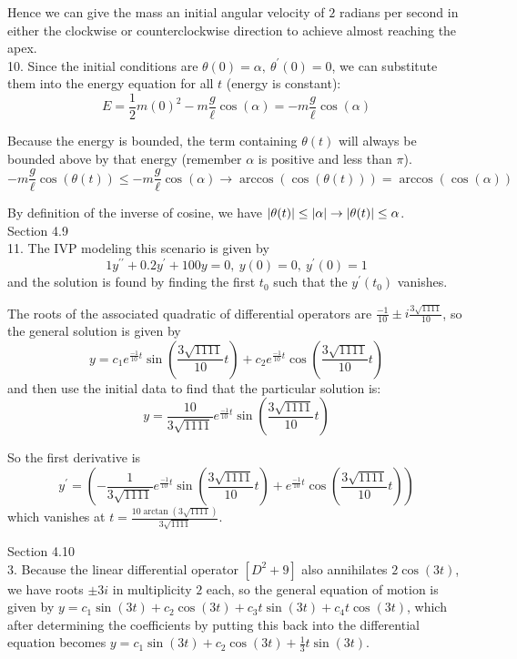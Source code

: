\documentclass[11pt]{article}
\newcommand{\br}[1]{\left(#1\right)}
\newcommand{\sbr}[1]{\left[#1\right]}
\newcommand{\dprime}{\prime\prime}
\begin{document}
Hence we can give the mass an initial angular velocity of $2$ radians per second in either the clockwise or counterclockwise direction to achieve almost reaching the apex.\\

10. Since the initial conditions are $\theta(0) = \alpha,~ \theta^{\prime}(0) = 0$, we can substitute them into the energy equation for all $t$ (energy is constant):
$$E = \frac{1}{2}m\br{0}^2-m\frac{g}{\ell}\cos(\alpha) = -m\frac{g}{\ell}\cos(\alpha)$$ 

Because the energy is bounded, the term containing $\theta(t)$ will always be bounded above by that energy (remember $\alpha$ is positive and less than $\pi$).
$$-m\frac{g}{\ell}\cos(\theta(t)) \leq -m\frac{g}{\ell}\cos(\alpha) \to \arccos(\cos(\theta(t))) = \arccos(\cos(\alpha)) $$

By definition of the inverse of cosine, we have $\abs{\theta(t)} \leq \abs{\alpha} \to \abs{\theta(t)} \leq \alpha$. \\

Section 4.9 \\

11. The IVP modeling this scenario is given by $$1y^{\dprime} + 0.2y^{\prime} + 100y = 0, ~y(0) = 0, ~y^{\prime}(0) = 1$$ and the solution is found by finding the first $t_0$ such that the $y^{\prime}(t_0)$ vanishes.

The roots of the associated quadratic of differential operators are $\frac{-1}{10}\pm i\frac{3\sqrt{1111}}{10}$, so the general solution is given by $$y = c_1e^{\frac{-1}{10}t}\sin(\frac{3\sqrt{1111}}{10}t) + c_2e^{\frac{-1}{10}t}\cos(\frac{3\sqrt{1111}}{10}t)$$ and then use the initial data to find that the particular solution is: $$y = \frac{10}{3\sqrt{1111}}e^{\frac{-1}{10}t}\sin(\frac{3\sqrt{1111}}{10}t)$$

So the first derivative is $$y^{\prime} = \br{-\frac{1}{3\sqrt{1111}}e^{\frac{-1}{10}t}\sin(\frac{3\sqrt{1111}}{10}t)+e^{\frac{-1}{10}t}\cos(\frac{3\sqrt{1111}}{10}t)}$$ which vanishes at $t = \frac{10\arctan(3\sqrt{1111})}{3\sqrt{1111}}$. \\

\newpage

Section 4.10 \\

3. Because the linear differential operator $\sbr{D^2+9}$ also annihilates $2\cos(3t)$, we have roots $\pm 3i$ in multiplicity $2$ each, so the general equation of motion is given by $y= c_1\sin(3t) + c_2\cos(3t) + c_3t\sin(3t) + c_4t\cos(3t)$, which after determining the coefficients by putting this back into the differential equation becomes $y= c_1\sin(3t) + c_2\cos(3t) + \frac{1}{3}t\sin(3t)$.
\end{document}
